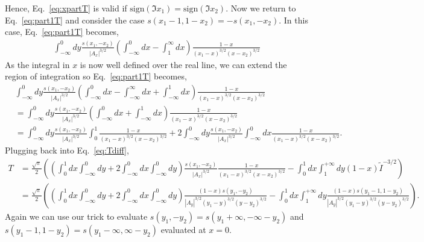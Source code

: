 \documentclass[twoside]{article}
\begin{document}
Hence, Eq.~\eqref{eq:xpartT} is valid if $\textrm{sign}(\Im x_1) = \textrm{sign}(\Im x_2)$. Now we return to Eq.~\eqref{eq:part1T} and consider the
case $s(x_1 - 1, 1-x_2) = -s(x_1,-x_2)$. In this case, Eq.~\eqref{eq:part1T} becomes,
\begin{align}
  \int^0_{-\infty}dy\frac{s(x_1, -x_2)}{|A_x|^{3/2}}\left( \int^0_{-\infty}dx - \int^{\infty}_1dx \right)\frac{1-x}{(x_1 - x)^{3/2}(x -
  x_2)^{3/2}}
\end{align}
As the integral in $x$ is now well defined over the real line, we can extend the region of integration so Eq.~\eqref{eq:part1T} becomes,
\begin{align}
  &\int^{0}_{-\infty}dy\frac{s(x_1, -x_2)}{|A_x|^{3/2}}\left( \int^0_{-\infty}dx - \int^{\infty}_{-\infty}dx + \int^{1}_{-\infty}dx
  \right)\frac{1-x}{(x_1 - x)^{3/2}(x-x_2)^{3/2}}\\
  &= \int^{0}_{-\infty}dy\frac{s(x_1, -x_2)}{|A_x|^{3/2}}\left( \int^{0}_{-\infty}dx + \int^{1}_{-\infty}dx \right)\frac{1-x}{(x_1 -
  x)^{3/2}(x - x_2)^{3/2}}\\
  &= \int^{0}_{-\infty}dy\frac{s(x_1, -x_2)}{|A_x|^{3/2}}\int^1_0\frac{1-x}{(x_1 - x)^{3/2}(x-x_2)^{3/2}} +
  2\int^0_{-\infty}dy\frac{s(x_1, -x_2)}{|A_x|^{3/2}}\int^0_{-\infty}dx \frac{1-x}{(x_1 - x)^{3/2}(x - x_2)^{3/2}}.
\end{align}
Plugging back into Eq.~\eqref{eq:Tdiff},
\begin{align}
  T &=  \frac{\sqrt{\pi}}{2}\left( \left(\int^{1}_{0}dx\int^{0}_{-\infty}dy + 2\int^0_{-\infty}dx\int^0_{-\infty}dy\right)\frac{s(x_1, -x_2)}{|A_x|^{3/2}}\frac{1-x}{(x_1 - x)^{3/2}(x -
  x_2)^{3/2}} - \int^1_0dx\int^{+\infty}_1dy(1-x)\tilde{I}^{-3/2} \right)\\
  &= \frac{\sqrt{\pi}}{2}\left( \left(\int^1_0dx\int^{0}_{-\infty}dy + 2\int^0_{-\infty}dx\int^{0}_{-\infty}dy\right)\frac{(1-x)s(y_1,-y_2)}{|A_y|^{3/2}(y_1 - y)^{3/2}(y - y_2)^{3/2}} -
  \int^1_0dx\int^{+\infty}_1dy\frac{(1-x)s(y_1 - 1, 1-y_2)}{|A_y|^{3/2}(y_1 - y)^{3/2}(y - y_2)^{3/2}} \right).
\end{align}
Again we can use our trick to evaluate $s(y_1, -y_2) = s(y_1 + \infty, -\infty - y_2)$ and $s(y_1 - 1, 1 - y_2) = s(y_1 - \infty, \infty -
y_2)$ evaluated at $x = 0$.
\end{document}
